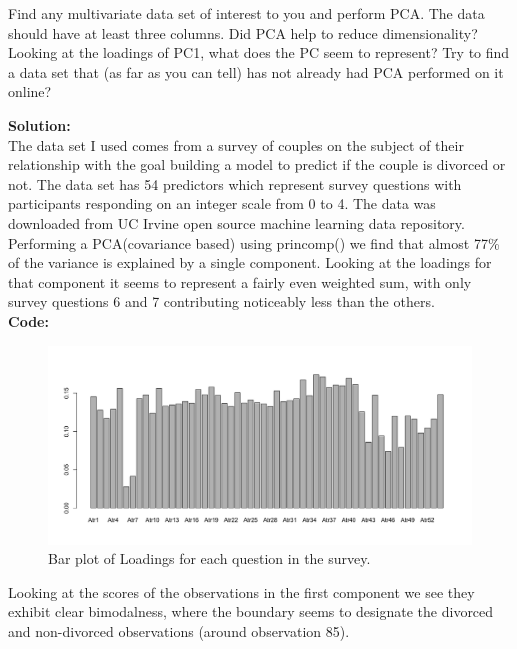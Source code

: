 \documentclass[12pt]{article}
\makeatletter
\theoremstyle{homework}
\newenvironment{exercise}[1]
{\def\@currentlabel{#1}\exercisecore}
{\endexercisecore}
\newcommand{\localhead}[1]{\par\smallskip\noindent\textbf{#1}\nobreak\\}%
\newcommand\solution{\localhead{Solution:}}
\makeatother
\begin{document}
\begin{exercise}{4} Find any multivariate data set of interest to you and perform PCA. The data should have at least three columns. Did PCA help to reduce 
  dimensionality? Looking at the loadings of PC1, what does the PC seem to represent? Try to find a data set that (as far as you can tell) has not already had PCA
  performed on it online?\\
  \solution The data set I used comes from a survey of couples on the subject of their relationship with the goal building a model to predict if the couple is divorced or not. The data set has
  54 predictors which represent survey questions with participants responding on an integer scale from 0 to 4. The data was downloaded from UC Irvine open source machine learning data repository.
  Performing a PCA(covariance based) using princomp() we find that almost 77\% of the variance is explained by a single component. Looking at the loadings for that component it seems to represent a fairly
  even weighted sum, with only survey questions 6 and 7 contributing noticeably less than the others.\\
  \textbf{Code:}
  \begin{center}
  
  \end{center} 
  \begin{figure}[H]
    \begin{center}
      \caption{Bar plot of Loadings for each question in the survey.}
    \includegraphics[width = \textwidth]{Rplot03.png}
    \end{center}
  \end{figure}



  Looking at the scores of the observations in the first component we see they exhibit clear bimodalness, where the boundary seems to designate the divorced and non-divorced observations (around observation 85).


\end{exercise}
\end{document}

